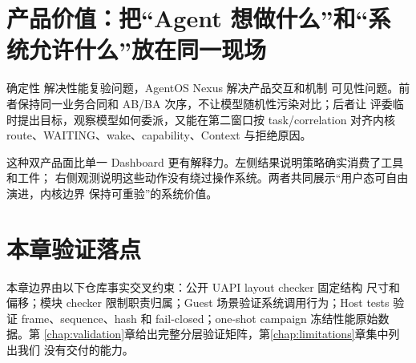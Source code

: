 \section{产品价值：把“Agent 想做什么”和“系统允许什么”放在同一现场}

确定性  解决性能复验问题，AgentOS Nexus 解决产品交互和机制
可见性问题。前者保持同一业务合同和 AB/BA 次序，不让模型随机性污染对比；后者让
评委临时提出目标，观察模型如何委派，又能在第二窗口按 task/correlation 对齐内核
route、WAITING、wake、capability、Context 与拒绝原因。

这种双产品面比单一 Dashboard 更有解释力。左侧结果说明策略确实消费了工具和工件；
右侧观测说明这些动作没有绕过操作系统。两者共同展示“用户态可自由演进，内核边界
保持可重验”的系统价值。

\section{本章验证落点}

本章边界由以下仓库事实交叉约束：公开 UAPI layout checker 固定结构
尺寸和偏移；模块 checker 限制职责归属；Guest 场景验证系统调用行为；Host tests 验证
frame、sequence、hash 和 fail-closed；one-shot campaign 冻结性能原始数据。第
\ref{chap:validation}章给出完整分层验证矩阵，第\ref{chap:limitations}章集中列出我们
没有交付的能力。
